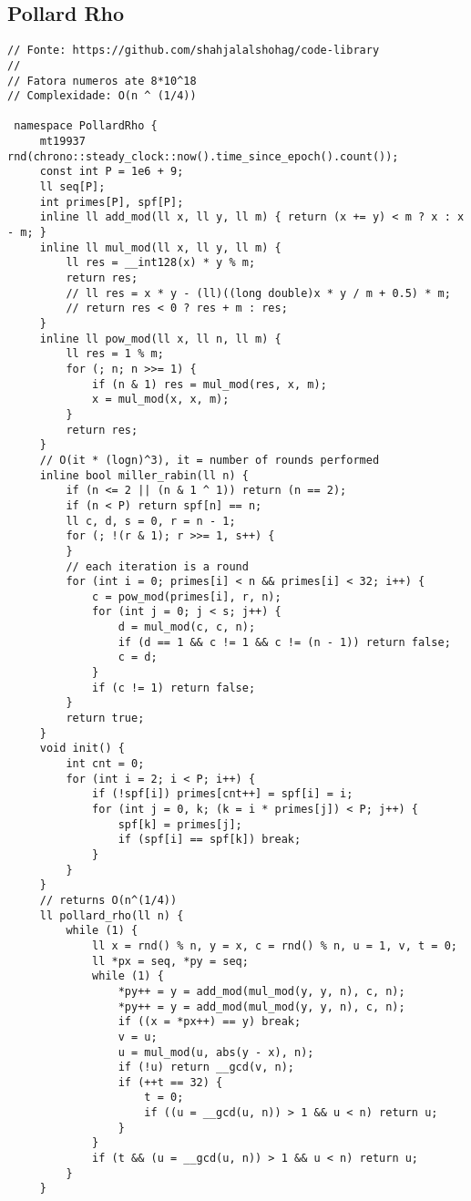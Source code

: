 \documentclass[11pt, a4paper, twoside]{article}
\begin{document}
\subsection{Pollard Rho}
\begin{lstlisting}
// Fonte: https://github.com/shahjalalshohag/code-library
//
// Fatora numeros ate 8*10^18
// Complexidade: O(n ^ (1/4))

 namespace PollardRho {
     mt19937 rnd(chrono::steady_clock::now().time_since_epoch().count());
     const int P = 1e6 + 9;
     ll seq[P];
     int primes[P], spf[P];
     inline ll add_mod(ll x, ll y, ll m) { return (x += y) < m ? x : x - m; }
     inline ll mul_mod(ll x, ll y, ll m) {
         ll res = __int128(x) * y % m;
         return res;
         // ll res = x * y - (ll)((long double)x * y / m + 0.5) * m;
         // return res < 0 ? res + m : res;
     }
     inline ll pow_mod(ll x, ll n, ll m) {
         ll res = 1 % m;
         for (; n; n >>= 1) {
             if (n & 1) res = mul_mod(res, x, m);
             x = mul_mod(x, x, m);
         }
         return res;
     }
     // O(it * (logn)^3), it = number of rounds performed
     inline bool miller_rabin(ll n) {
         if (n <= 2 || (n & 1 ^ 1)) return (n == 2);
         if (n < P) return spf[n] == n;
         ll c, d, s = 0, r = n - 1;
         for (; !(r & 1); r >>= 1, s++) {
         }
         // each iteration is a round
         for (int i = 0; primes[i] < n && primes[i] < 32; i++) {
             c = pow_mod(primes[i], r, n);
             for (int j = 0; j < s; j++) {
                 d = mul_mod(c, c, n);
                 if (d == 1 && c != 1 && c != (n - 1)) return false;
                 c = d;
             }
             if (c != 1) return false;
         }
         return true;
     }
     void init() {
         int cnt = 0;
         for (int i = 2; i < P; i++) {
             if (!spf[i]) primes[cnt++] = spf[i] = i;
             for (int j = 0, k; (k = i * primes[j]) < P; j++) {
                 spf[k] = primes[j];
                 if (spf[i] == spf[k]) break;
             }
         }
     }
     // returns O(n^(1/4))
     ll pollard_rho(ll n) {
         while (1) {
             ll x = rnd() % n, y = x, c = rnd() % n, u = 1, v, t = 0;
             ll *px = seq, *py = seq;
             while (1) {
                 *py++ = y = add_mod(mul_mod(y, y, n), c, n);
                 *py++ = y = add_mod(mul_mod(y, y, n), c, n);
                 if ((x = *px++) == y) break;
                 v = u;
                 u = mul_mod(u, abs(y - x), n);
                 if (!u) return __gcd(v, n);
                 if (++t == 32) {
                     t = 0;
                     if ((u = __gcd(u, n)) > 1 && u < n) return u;
                 }
             }
             if (t && (u = __gcd(u, n)) > 1 && u < n) return u;
         }
     }
 

\end{lstlisting}
\end{document}
